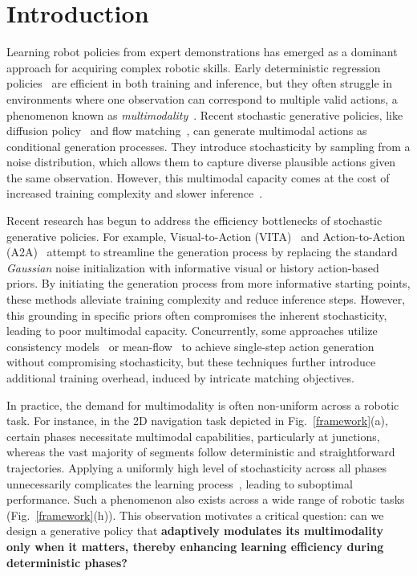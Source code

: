 
\section{Introduction}

Learning robot policies from expert demonstrations has emerged as a dominant approach for acquiring complex robotic skills. Early deterministic regression policies~\citep{bain1995framework, osa2018algorithmic, jia2025FORESEERR} are efficient in both training and inference, but they often struggle in environments where one observation can correspond to multiple valid actions, a phenomenon known as \textit{multimodality}~\citep{wang2017robust, shafiullah2022behavior, florence2021implicit}. Recent stochastic generative policies, like diffusion policy~\citep{dp,ddpm} and flow matching~\citep{flowmatching}, can generate multimodal actions as conditional generation processes. They introduce stochasticity by sampling from a noise distribution, which allows them to capture diverse plausible actions given the same observation. However, this multimodal capacity comes at the cost of increased training complexity and slower inference~\citep{pan2025much}.

Recent research has begun to address the efficiency bottlenecks of stochastic generative policies. For example, Visual-to-Action (VITA)~\citep{gao2025vita} and Action-to-Action (A2A)~\citep{jia2026action} attempt to streamline the generation process by replacing the standard \textit{Gaussian} noise initialization with informative visual or history action-based priors. By initiating the generation process from more informative starting points, these methods alleviate training complexity and reduce inference steps. However, this grounding in specific priors often compromises the inherent stochasticity, leading to poor multimodal capacity. Concurrently, some approaches utilize consistency models~\citep{li2026ofp, zhang2025flowpolicy, Consistency} or mean-flow~\citep{fang2025omp, geng2026mean} to achieve single-step action generation without compromising stochasticity, but these techniques further introduce additional training overhead, induced by intricate matching objectives.

In practice, the demand for multimodality is often non-uniform across a robotic task. For instance, in the 2D navigation task depicted in Fig.~\ref{framework}(a), certain phases necessitate multimodal capabilities, particularly at junctions, whereas the vast majority of segments follow deterministic and straightforward trajectories. Applying a uniformly high level of stochasticity across all phases unnecessarily complicates the learning process~\citep{pan2025much}, leading to suboptimal performance. Such a phenomenon also exists across a wide range of robotic tasks (Fig.~\ref{framework}(h)). This observation motivates a critical question: can we design a generative policy that \textbf{adaptively modulates its multimodality only when it matters, thereby enhancing learning efficiency during deterministic phases?}

